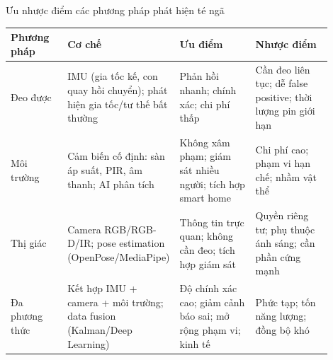 \begin{frame}{Ưu nhược điểm các phương pháp phát hiện té ngã}
\scriptsize
\begin{tabular}{|p{0.18\linewidth}|p{0.22\linewidth}|p{0.25\linewidth}|p{0.25\linewidth}|}
\hline
\textbf{Phương pháp} & \textbf{Cơ chế} & \textbf{Ưu điểm} & \textbf{Nhược điểm} \\
\hline
Đeo được & IMU (gia tốc kế, con quay hồi chuyển); phát hiện gia tốc/tư thế bất thường & Phản hồi nhanh; chính xác; chi phí thấp & Cần đeo liên tục; dễ false positive; thời lượng pin giới hạn \\
\hline
Môi trường & Cảm biến cố định: sàn áp suất, PIR, âm thanh; AI phân tích & Không xâm phạm; giám sát nhiều người; tích hợp smart home & Chi phí cao; phạm vi hạn chế; nhầm vật thể \\
\hline
Thị giác & Camera RGB/RGB-D/IR; pose estimation (OpenPose/MediaPipe) & Thông tin trực quan; không cần đeo; tích hợp giám sát & Quyền riêng tư; phụ thuộc ánh sáng; cần phần cứng mạnh \\
\hline
Đa phương thức & Kết hợp IMU + camera + môi trường; data fusion (Kalman/Deep Learning) & Độ chính xác cao; giảm cảnh báo sai; mở rộng phạm vi; kinh tế & Phức tạp; tốn năng lượng; đồng bộ khó \\
\hline
\end{tabular}

\end{frame}

